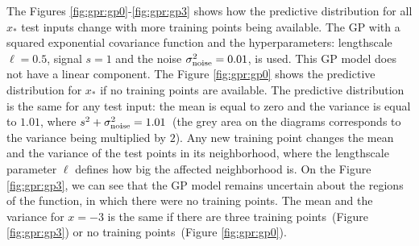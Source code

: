 \noindent The Figures \ref{fig:gpr:gp0}-\ref{fig:gpr:gp3} shows how the predictive distribution for all $x_{*}$ test inputs change with more training points being available. The GP with a squared exponential covariance function and the hyperparameters: lengthscale $\ell=0.5$, signal $s=1$ and the noise  $\sigma_{\rm noise}^2=0.01$, is used. This GP model does not have a linear component. The Figure \ref{fig:gpr:gp0} shows the predictive distribution for $x_{*}$ if no training points are available. The predictive distribution is the same for any test input: the mean is equal to zero and the variance is equal to $1.01$, where $s^2+\sigma_{\rm noise}^2=1.01$\ (the grey area on the diagrams corresponds to the variance being multiplied by $2$). Any new training point changes the mean and the variance of the test points in its neighborhood, where the lengthscale parameter $\ell$ defines how big the affected neighborhood is. On the Figure \ref{fig:gpr:gp3}, we can see that the GP model remains uncertain about the regions of the function, in which there were no training points. The mean and the variance for $x=-3$ is the same if there are three training points\ (Figure \ref{fig:gpr:gp3}) or no training points\ (Figure \ref{fig:gpr:gp0}).

